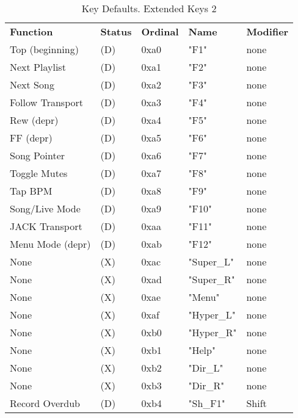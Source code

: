    \begin{table}[htb!]
      \centering
      \caption{Key Defaults. Extended Keys 2}
      \label{table:key_defaults_extended_keys_2}
      \begin{tabular}{l l l l l}
        \textbf{Function} & \textbf{Status} & \textbf{Ordinal} & \textbf{Name} & \textbf{Modifier} \\
        Top (beginning)    & (D)  &  0xa0   & "F1"         & none \\
        Next Playlist      & (D)  &  0xa1   & "F2"         & none \\
        Next Song          & (D)  &  0xa2   & "F3"         & none \\
        Follow Transport   & (D)  &  0xa3   & "F4"         & none \\
        Rew (depr)         & (D)  &  0xa4   & "F5"         & none \\
        FF (depr)          & (D)  &  0xa5   & "F6"         & none \\
        Song Pointer       & (D)  &  0xa6   & "F7"         & none \\
        Toggle Mutes       & (D)  &  0xa7   & "F8"         & none \\
        Tap BPM            & (D)  &  0xa8   & "F9"         & none \\
        Song/Live Mode     & (D)  &  0xa9   & "F10"        & none \\
        JACK Transport     & (D)  &  0xaa   & "F11"        & none \\
        Menu Mode (depr)   & (D)  &  0xab   & "F12"        & none \\
        None               & (X)  &  0xac   & "Super\_L"   & none \\
        None               & (X)  &  0xad   & "Super\_R"   & none \\
        None               & (X)  &  0xae   & "Menu"       & none \\
        None               & (X)  &  0xaf   & "Hyper\_L"   & none \\
        None               & (X)  &  0xb0   & "Hyper\_R"   & none \\
        None               & (X)  &  0xb1   & "Help"       & none \\
        None               & (X)  &  0xb2   & "Dir\_L"     & none \\
        None               & (X)  &  0xb3   & "Dir\_R"     & none \\
        Record Overdub     & (D)  &  0xb4   & "Sh\_F1"     & Shift \\

\end{tabular}
\end{table}
